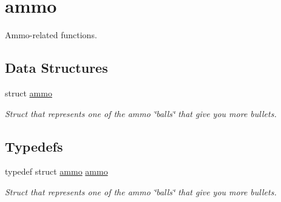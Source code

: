 \hypertarget{group__ammo}{}\section{ammo}
\label{group__ammo}


Ammo-\/related functions.  


\subsection*{Data Structures}
\begin{DoxyCompactItemize}
\item 
struct \hyperlink{structammo}{ammo}
\begin{DoxyCompactList}\small\item\em Struct that represents one of the ammo \char`\"{}balls\char`\"{} that give you more bullets. \end{DoxyCompactList}\end{DoxyCompactItemize}
\subsection*{Typedefs}
\begin{DoxyCompactItemize}
\item 
typedef struct \hyperlink{structammo}{ammo} \hyperlink{group__ammo_ga2beee330181a5b70a5c47092391bb174}{ammo}
\begin{DoxyCompactList}\small\item\em Struct that represents one of the ammo \char`\"{}balls\char`\"{} that give you more bullets. \end{DoxyCompactList}\end{DoxyCompactItemize}

